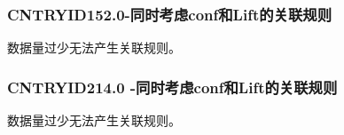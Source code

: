 \documentclass[12pt, a4paper, oneside]{ctexart}
\begin{document}
\subsubsection{CNTRYID152.0-同时考虑conf和Lift的关联规则 } 
数据量过少无法产生关联规则。

\subsubsection{CNTRYID214.0 -同时考虑conf和Lift的关联规则 } 
数据量过少无法产生关联规则。
\end{document}
